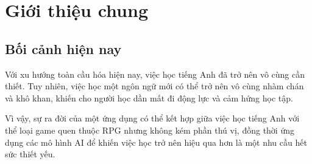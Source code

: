 \section{Giới thiệu chung}
\subsection{Bối cảnh hiện nay}
Với xu hướng toàn cầu hóa hiện nay, việc học tiếng Anh đã trở nên vô cùng cần thiết. Tuy nhiên, việc học một ngôn ngữ mới có thể trở nên vô cùng nhàm chán và khô khan, khiến cho người học dần mất đi động lực và cảm hứng học tập.

Vì vậy, sự ra đời của một ứng dụng có thể kết hợp giữa việc học tiếng Anh với thể loại game quen thuộc RPG nhưng không kém phần thú vị, đồng thời ứng dụng các mô hình AI để khiến việc học trở nên hiệu qua hơn là một nhu cầu hết sức thiết yếu.
